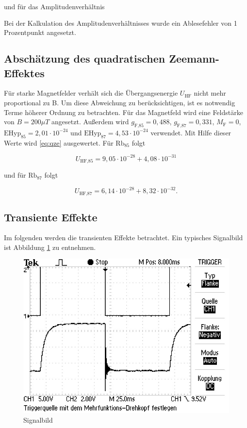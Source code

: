 und für das Amplitudenverhältnis



Bei der Kalkulation des Amplitudenverhältnisses wurde ein Ablesefehler von 1 Prozentpunkt
angesetzt.

\subsection{Abschätzung des quadratischen Zeemann-Effektes}
Für starke Magnetfelder verhält sich die Übergangsenergie $U_\text{HF}$ nicht mehr proportional zu B. Um diese Abweichung zu berücksichtigen, ist es notwendig Terme höherer Ordnung zu betrachten.
Für das Magnetfeld wird eine Feldstärke von $B = 200 \mu T$ angesetzt. Außerdem wird $g_\text{F,85} = 0,488$, $g_\text{F,87} = 0,331$, $M_\text{F} = 0$, 
$\text{EHyp}_{85} = 2,01 \cdot 10^{-24}$ und $\text{EHyp}_{87} = 4,53 \cdot 10^{-24}$ \cite{FP} verwendet. Mit Hilfe dieser Werte wird \ref{eq:qze} ausgewertet. Für $\text{Rb}_{85}$ folgt

\begin{equation}
U_\text{HF,85} = 9,05 \cdot 10^{-28} + 4,08 \cdot 10^{-31}
\end{equation}

und für $\text{Rb}_{87}$ folgt

\begin{equation}
U_\text{HF,87} = 6,14 \cdot 10^{-28} + 8,32 \cdot 10^{-32}.
\end{equation}


\subsection{Transiente Effekte}
Im folgenden werden die transienten Effekte betrachtet. Ein typisches Signalbild ist Abbildung \ref{sigPic} zu entnehmen.

\begin{figure}[h]
\centering
\includegraphics[width=\textwidth]{img/TEK0019.JPG}
\caption{Signalbild}
\label{sigPic}
\end{figure}

